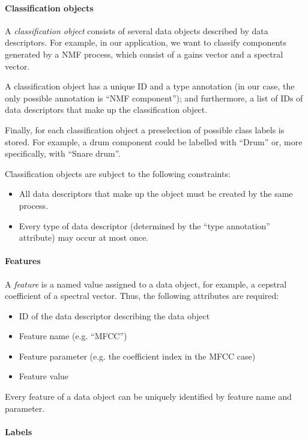 \paragraph{Classification objects}

A \emph{classification object} consists of several data objects described by
data descriptors. For example, in our application, we want to classify
components generated by a NMF process, which consist of a gains vector and a
spectral vector.

A classification object has a unique ID and a type annotation (in our case, the
only possible annotation is ``NMF component''); and furthermore, a list of IDs
of data descriptors that make up the classification object.

Finally, for each classification object a preselection of possible class labels
is stored. For example, a drum component could be labelled with ``Drum'' or,
more specifically, with ``Snare drum''.

Classification objects are subject to the following constraints:
\begin{itemize}
    \item   All data descriptors that make up the object must be created by the
            same process.
    \item   Every type of data descriptor (determined by the ``type
            annotation'' attribute) may occur at most once.
\end{itemize}


\paragraph{Features}

A \emph{feature} is a named value assigned to a data object, for example, a
cepstral coefficient of a spectral vector. Thus, the following attributes are
required:
\begin{itemize}
    \item   ID of the data descriptor describing the data object
    \item   Feature name (e.g. ``MFCC'')
    \item   Feature parameter (e.g. the coefficient index in the MFCC case)
    \item   Feature value
\end{itemize}
Every feature of a data object can be uniquely identified by feature name and
parameter.


\paragraph{Labels}

